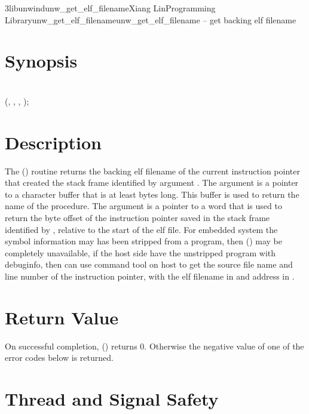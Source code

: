 \documentclass{article}
\begin{document}
\begin{Name}{3libunwind}{unw\_get\_elf\_filename}{Xiang Lin}{Programming Library}{unw\_get\_elf\_filename}unw\_get\_elf\_filename -- get backing elf filename
\end{Name}

\section{Synopsis}

\\

 (, ,  , );\\

\section{Description}

The () routine returns the backing elf
filename of the current instruction pointer that created the stack frame
identified by argument .  The  argument is a pointer
to a character buffer that is at least  bytes long.  This buffer
is used to return the name of the procedure.  The  argument is
a pointer to a word that is used to return the byte offset of the instruction
pointer saved in the stack frame identified by , relative to the
start of the elf file. For embedded system the symbol information may has
been stripped from a program, then () may be
completely unavailable, if the host side have the unstripped program with
debuginfo, then can use  command tool on host to get the
source file name and line number of the instruction pointer, with the elf
filename in  and address in .

\section{Return Value}

On successful completion, () returns 0.
Otherwise the negative value of one of the error codes below is
returned.

\section{Thread and Signal Safety}
\end{document}
